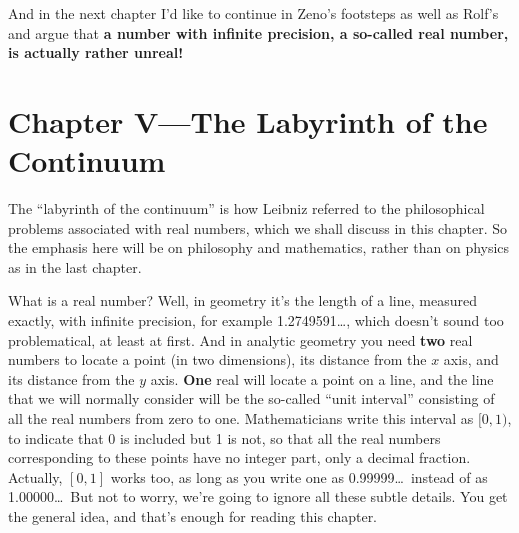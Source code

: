 \documentclass[12pt]{book}
\begin{document}
And in the next chapter I'd like to continue in Zeno's footsteps as well as Rolf's and argue
that \textbf{a number with infinite precision, a so-called real number, is actually
rather unreal!}

\chapter*{Chapter V---The Labyrinth of the Continuum}

The ``labyrinth of the continuum'' is how Leibniz referred to the philosophical problems
associated with real numbers, which we shall discuss in this chapter.
So the emphasis here will be on philosophy and mathematics, rather than on physics as
in the last chapter.
 
What is a real number? Well, in geometry
it's the length of a line, measured exactly, with infinite
precision, for example 1.2749591\ldots, which doesn't sound too problematical, 
at least at first.
And in analytic
geometry you need \textbf{two} real numbers to locate a point (in two dimensions), its
distance from the $x$ axis, and its distance from the $y$ axis.
\textbf{One} real will locate a point on a line,
and the line that we will normally consider will be the so-called ``unit interval''
consisting of all the real numbers from zero to one.
Mathematicians write this interval as $[0,1)$,  to indicate that 0 is included but 1 is not,
so that all the real numbers corresponding to these points have no integer part,
only a decimal fraction.
Actually, $[0,1]$ works too, as long as you write one as 0.99999\ldots\ instead of as 1.00000\ldots\
But not to worry, we're going to ignore all these subtle details. You get the general 
idea, and that's enough for reading this chapter.
 
\end{document}
